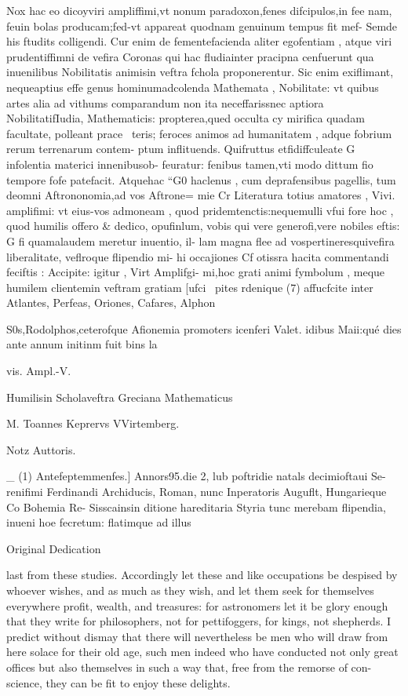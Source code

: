 \documentclass{article}
\begin{document}
{{{{{{{Nox hac eo dicoyviri ampliffimi,vt nonum paradoxon,fenes difcipulos,in fee
nam, feuin bolas producam;fed-vt appareat quodnam genuinum tempus fit mef-
Semde his ftudits colligendi. Cur enim de fementefacienda aliter egofentiam , atque
viri prudentiffimni de vefira Coronas qui hac fludiainter pracipna cenfuerunt qua
inuenilibus Nobilitatis animisin veftra fchola proponerentur. Sic enim exiflimant,
nequeaptius effe genus hominumadcolenda Mathemata , Nobilitate: vt quibus
artes alia ad vithums comparandum non ita neceffarissnec aptiora NobilitatifIudia,
Mathematicis: propterea,qued occulta cy mirifica quadam facultate, polleant prace~
teris; feroces animos ad humanitatem , adque fobrium rerum terrenarum contem-
ptum inflituends. Quifruttus etfidiffculeate G infolentia materici innenibusob-
feuratur: fenibus tamen,vti modo dittum fio tempore fofe patefacit. Atquehac “G0
haclenus , cum deprafensibus pagellis, tum deomni Aftrononomia,ad vos Aftrone=
mie Cr Literatura totius amatores , Vivi. amplifimi: vt eius-vos admoneam , quod
pridemtenctis:nequemulli vfui fore hoc , quod humilis offero & dedico, opufinlum,
vobis qui vere generofi,vere nobiles eftis: G fi quamalaudem meretur inuentio, il-
lam magna flee ad vospertineresquivefira liberalitate, veflroque flipendio mi-
hi occajiones Cf otissra hacita commentandi feciftis : Accipite: igitur , Virt Amplifgi-
mi,hoc grati animi fymbolum , meque humilem clientemin veftram gratiam [ufci~
pites rdenique (7) affucfcite inter Atlantes, Perfeas, Oriones, Cafares, Alphon~

S0s,Rodolphos,ceterofque Afionemia promoters icenferi Valet. idibus Maii:qué
dies ante annum initinm fuit bins la

vis.
Ampl.-V.

Humilisin Scholaveftra Greciana
Mathematicus

M. Toannes Keprervs
VVirtemberg.

Notz Auttoris.

_ (1) Antefeptemmenfes.] Annors95.die 2, lub poftridie natals decimioftaui Se-
renifimi Ferdinandi Archiducis, Roman, nunc Inperatoris Auguflt, Hungarieque Co Bohemia Re-
Sisscainsin ditione hareditaria Styria tunc merebam flipendia, inueni hoe fecretum: flatimque ad
illus


Original Dedication

last from these studies. Accordingly let these and like occupations be despised by
whoever wishes, and as much as they wish, and let them seek for themselves
everywhere profit, wealth, and treasures: for astronomers let it be glory enough
that they write for philosophers, not for pettifoggers, for kings, not shepherds. I
predict without dismay that there will nevertheless be men who will draw from
here solace for their old age, such men indeed who have conducted not only great
offices but also themselves in such a way that, free from the remorse of con-
science, they can be fit to enjoy these delights.

}}}}}}}
\end{document}
